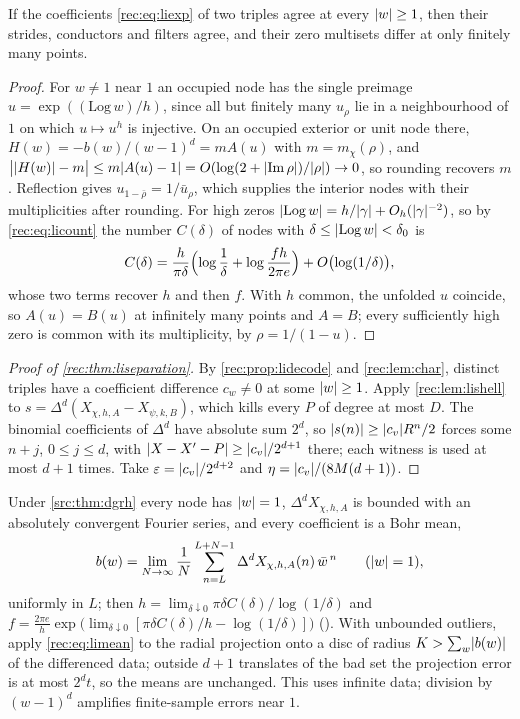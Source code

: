 \begin{proposition}\label{rec:prop:lidecode}
If the coefficients \eqref{rec:eq:liexp} of two triples agree at every $\lvert w\rvert\ge1$, then their
strides, conductors and filters agree, and their zero multisets differ at only finitely many
points.
\end{proposition}

\begin{proof}
For $w\ne1$ near $1$ an occupied node has the single preimage $u=\exp((\mathrm{Log}\,w)/h)$, since
all but finitely many $u_\rho$ lie in a neighbourhood of $1$ on which $u\mapsto u^h$ is injective. On
an occupied exterior or unit node there, $H(w)=-b(w)/(w-1)^d=mA(u)$ with $m=m_\chi(\rho)$, and
$\bigl\lvert\lvert H(w)\rvert-m\bigr\rvert\le m\lvert A(u)-1\rvert=O(\log(2+\lvert\operatorname{Im}\rho\rvert)/\lvert\rho\rvert)\to0$, so rounding
recovers $m$. Reflection gives $u_{1-\bar\rho}=1/\bar u_\rho$, which supplies the interior nodes
with their multiplicities after rounding. For high zeros
$\lvert\mathrm{Log}\,w\rvert=h/\lvert\gamma\rvert+O_h(\lvert\gamma\rvert^{-2})$, so by \eqref{rec:eq:licount} the number
$C(\delta)$ of nodes with $\delta\le\lvert\mathrm{Log}\,w\rvert<\delta_0$ is
\[
 C(\delta)=\frac h{\pi\delta}\Bigl(\log\frac1\delta+\log\frac{fh}{2\pi e}\Bigr)+O\bigl(\log(1/\delta)\bigr),
\]
whose two terms recover $h$ and then $f$. With $h$ common, the unfolded $u$ coincide, so $A(u)=B(u)$
at infinitely many points and $A=B$; every sufficiently high zero is common with its multiplicity,
by $\rho=1/(1-u)$.
\end{proof}

\begin{proof}[Proof of \cref{rec:thm:liseparation}]
By \cref{rec:prop:lidecode} and \cref{rec:lem:char}, distinct triples have a coefficient difference
$c_w\ne0$ at some $\lvert w\rvert\ge1$. Apply \cref{rec:lem:lishell} to
$s=\Delta^d(X_{\chi,h,A}-X_{\psi,k,B})$, which kills every $P$ of degree at most $D$. The binomial
coefficients of $\Delta^d$ have absolute sum $2^d$, so $\lvert s(n)\rvert\ge\lvert c_v\rvert R^n/2$ forces some
$n+j$, $0\le j\le d$, with $\lvert X-X'-P\rvert\ge\lvert c_v\rvert/2^{d+1}$ there; each witness is used at most $d+1$
times. Take $\varepsilon=\lvert c_v\rvert/2^{d+2}$ and $\eta=\lvert c_v\rvert/(8M(d+1))$.
\end{proof}

Under \cref{src:thm:dgrh} every node has $\lvert w\rvert=1$, $\Delta^dX_{\chi,h,A}$ is bounded with an
absolutely convergent Fourier series, and every coefficient is a Bohr mean,
\begin{equation}\label{rec:eq:limean}
 b(w)=\lim_{N\to\infty}\frac1N\sum_{n=L}^{L+N-1}\Delta^dX_{\chi,h,A}(n)\,\bar w^{\,n}\qquad(\lvert w\rvert=1),
\end{equation}
uniformly in $L$; then
$h=\lim_{\delta\downarrow0}\pi\delta C(\delta)/\log(1/\delta)$ and
$f=\frac{2\pi e}h\exp\bigl(\lim_{\delta\downarrow0}[\pi\delta C(\delta)/h-\log(1/\delta)]\bigr)$
(\stG). With unbounded outliers, apply \eqref{rec:eq:limean} to the radial projection onto a disc of
radius $K>\sum_w\lvert b(w)\rvert$ of the differenced data; outside $d+1$ translates of the bad set the
projection error is at most $2^dt$, so the means are unchanged. This uses infinite data; division by
$(w-1)^d$ amplifies finite-sample errors near $1$.

